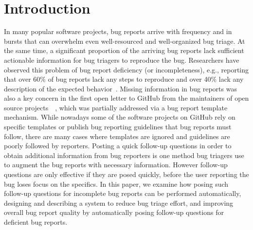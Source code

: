 \section{Introduction}

In many popular software projects, bug reports arrive with frequency and in bursts that can overwhelm even well-resourced and well-organized bug triage.
%
At the same time, a significant proportion of the arriving bug reports lack sufficient actionable information for bug triagers to reproduce the bug.
%
Researchers have observed this problem of bug report deficiency (or incompleteness), e.g., reporting that over 60\% of bug reports lack any steps to reproduce and over 40\% lack any description of the expected behavior~\cite{chaparro17detecting}.
%
Missing information in bug reports was also a key concern in the first open letter to GitHub from the maintainers of open source projects~\cite{deargithub}~\cite{breu2010information}, which was partially addressed via a bug report template mechanism.
%
While nowadays some of the software projects on GitHub rely on specific templates or publish bug reporting guidelines that bug reports must follow, there are many cases where templates are ignored and guidelines are poorly followed by reporters.
%
Posting a quick follow-up questions in order to obtain additional information from bug reporters is one method bug triagers use to augment the bug reports with necessary information.
%
However follow-up questions are only effective if they are posed quickly, before the user reporting the bug loses focus on the specifics.
%
In this paper, we examine how posing such follow-up questions for incomplete bug reports can be performed automatically, designing and describing a system to reduce bug triage effort, and improving overall bug report quality by automatically posing follow-up questions for deficient bug reports.

